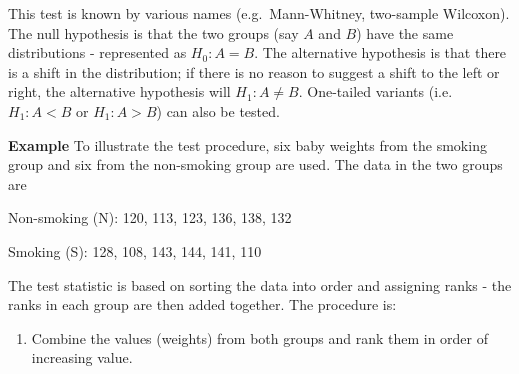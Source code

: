 \documentclass[
  oneside]{krantz}
\providecommand{\tightlist}{%
  \setlength{\itemsep}{0pt}\setlength{\parskip}{0pt}}
\begin{document}
This test is known by various names (e.g.~Mann-Whitney, two-sample Wilcoxon). The null hypothesis is that the two groups (say \(A\) and \(B\)) have the same distributions - represented as \(H_0: A = B\). The alternative hypothesis is that there is a shift in the distribution; if there is no reason to suggest a shift to the left or right, the alternative hypothesis will \(H_1: A \ne B\). One-tailed variants (i.e.~\(H_1: A < B\) or \(H_1: A > B\)) can also be tested.

\textbf{Example} To illustrate the test procedure, six baby weights from the smoking group and six from the non-smoking group are used. The data in the two groups are

Non-smoking (N): 120, 113, 123, 136, 138, 132

Smoking (S): 128, 108, 143, 144, 141, 110

The test statistic is based on sorting the data into order and assigning ranks - the ranks in each group are then added together. The procedure is:

\begin{enumerate}
\def\labelenumi{\arabic{enumi}.}
\tightlist
\item
  Combine the values (weights) from both groups and rank them in order of increasing value.
\end{enumerate}
\end{document}

